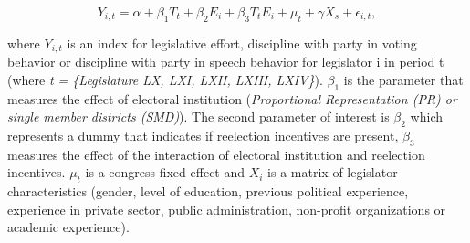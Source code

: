 \documentclass{article}
\begin{document}
\begin{equation}
Y_{i, t} = \alpha + \beta_1 T_t + \beta_2 E_i + \beta_3 T_t E_i + \mu_t + \gamma X_s+ \epsilon_{i, t},
\end{equation}

where $Y_{i,t}$ is an index for legislative effort, discipline with party in voting behavior or discipline with party in speech behavior for legislator i in period t (where \textit{t = \{Legislature LX, LXI, LXII, LXIII, LXIV\}}). $\beta_1$ is the parameter that measures the effect of electoral institution (\textit{Proportional Representation (PR) or single member districts (SMD)}). The second parameter of interest is $\beta_2$ which represents a dummy that indicates if reelection incentives are present, $\beta_3$ measures the effect of the interaction of electoral institution and reelection incentives. $\mu_t$ is a congress fixed effect and $X_i$ is a matrix of legislator characteristics (gender, level of education, previous political experience, experience in private sector, public administration, non-profit organizations or academic experience).\\
\\
\end{document}
